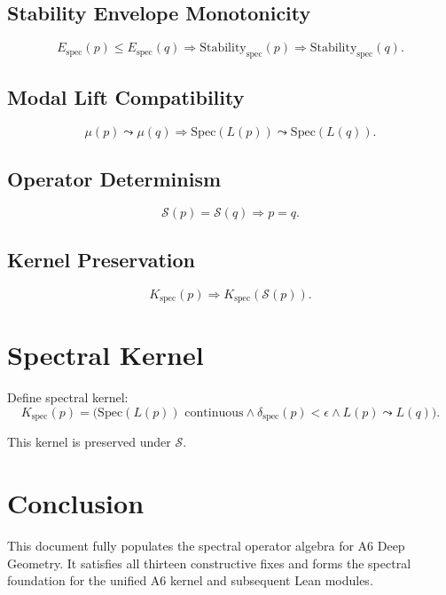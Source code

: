 \documentclass[11pt]{article}
\begin{document}
\subsection{Stability Envelope Monotonicity}
\[
E_{\mathrm{spec}}(p) \le E_{\mathrm{spec}}(q)
  \Rightarrow \text{Stability}_{\mathrm{spec}}(p)
  \Rightarrow \text{Stability}_{\mathrm{spec}}(q).
\]

\subsection{Modal Lift Compatibility}
\[
\mu(p) \leadsto \mu(q)
  \Rightarrow \mathrm{Spec}(L(p)) \leadsto \mathrm{Spec}(L(q)).
\]

\subsection{Operator Determinism}
\[
\mathcal{S}(p) = \mathcal{S}(q) \Rightarrow p = q.
\]

\subsection{Kernel Preservation}
\[
K_{\mathrm{spec}}(p) \Rightarrow K_{\mathrm{spec}}(\mathcal{S}(p)).
\]

\section{Spectral Kernel}

Define spectral kernel:
\[
K_{\mathrm{spec}}(p) =
  \big(
    \mathrm{Spec}(L(p)) \text{ continuous}
    \land \delta_{\mathrm{spec}}(p) < \epsilon
    \land L(p) \leadsto L(q)
  \big).
\]

This kernel is preserved under $\mathcal{S}$.

\section{Conclusion}

This document fully populates the spectral operator algebra for A6 Deep
Geometry. It satisfies all thirteen constructive fixes and forms the spectral
foundation for the unified A6 kernel and subsequent Lean modules.
\end{document}
